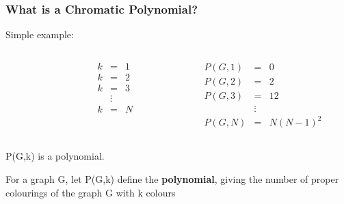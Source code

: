 \documentclass{beamer}
\begin{document}
\begin{frame}
\frametitle{What is a Chromatic Polynomial?}
\alert{Simple example:} 
\begin{columns}
\begin{column}{4cm}
\end{column}
\begin{column}{2cm}
\begin{align*}
   k &=& 1 \\
   k &=& 2 \\
   k &=& 3 \\
         &\vdots& \\
   k &=& N
\end{align*}
\end{column}

\begin{column}{2cm}
\begin{align*}
   P(G,1) &=& 0 \\
   P(G,2) &=& 2 \\
   P(G,3) &=& 12 \\
         &\vdots& \\
   P(G,N) &=& N(N-1)^2
\end{align*}
\end{column}
\end{columns}

\begin{theorem}
P(G,k) is a polynomial.
\end{theorem}

\begin{definition}
For a graph G, let P(G,k) define the \textbf{polynomial}, giving the number of proper colourings of the graph G with k colours
\end{definition}
\end{frame}
\end{document}
